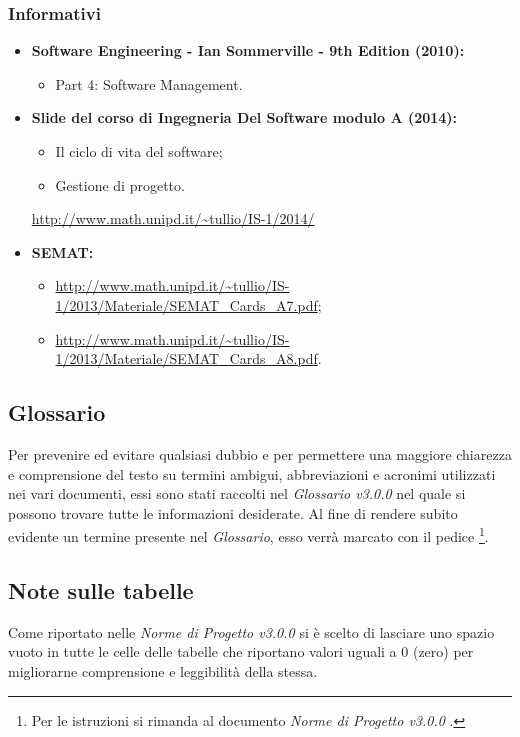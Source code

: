 \subsubsection{Informativi}
\label{sezione 1.2.2}
\begin{itemize}
	\item \textbf{Software Engineering - Ian Sommerville - 9th Edition (2010):} 
	\begin{itemize}
		\item Part 4: Software Management.
	\end{itemize}
	\item \textbf{\gls{Slide} del corso di Ingegneria Del Software modulo A (2014):} 
	\begin{itemize}
		\item Il ciclo di vita del software; 
		\item Gestione di progetto.
	\end{itemize}
	\url{http://www.math.unipd.it/~tullio/IS-1/2014/}
	\item \textbf{\gls{SEMAT}:}
	\begin{itemize}
		\item \url{http://www.math.unipd.it/~tullio/IS-1/2013/Materiale/SEMAT_Cards_A7.pdf};
		\item \url{http://www.math.unipd.it/~tullio/IS-1/2013/Materiale/SEMAT_Cards_A8.pdf}.	
	\end{itemize}
\end{itemize}

\subsection{Glossario}
Per prevenire ed evitare qualsiasi dubbio e per permettere una maggiore chiarezza e comprensione del testo su termini ambigui, abbreviazioni e acronimi utilizzati nei vari documenti, essi sono stati raccolti nel \textit{Glossario v3.0.0} nel quale si possono trovare tutte le informazioni desiderate.
Al fine di rendere subito evidente un termine presente nel \textit{Glossario}, esso verrà marcato con il pedice \G\footnote{Per le istruzioni si rimanda al documento \textit{Norme di Progetto v3.0.0} .}.

\subsection{Note sulle tabelle}
Come riportato nelle \textit{Norme di Progetto v3.0.0} si è scelto di lasciare uno spazio vuoto in tutte le celle delle tabelle che riportano valori uguali a 0 (zero) per migliorarne comprensione e leggibilità della stessa.

